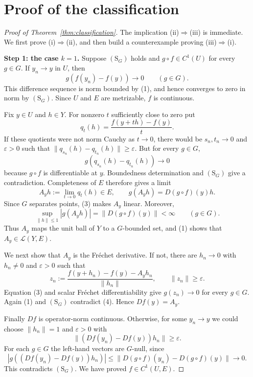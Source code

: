 \documentclass[11pt]{article}
\newcommand{\Lop}{\mathcal L}
\newcommand{\SG}{(\mathrm{S}_G)}
\begin{document}
\section{Proof of the classification}

\begin{proof}[Proof of Theorem~\ref{thm:classification}]
The implication (ii)$\Rightarrow$(iii) is immediate.  We first prove
(i)$\Rightarrow$(ii), and then build a counterexample proving
(iii)$\Rightarrow$(i).

\medskip
\noindent\textbf{Step 1: the case $k=1$.}
Suppose $\SG$ holds and $g\circ f\in C^1(U)$ for every $g\in G$.  If
$y_n\to y$ in $U$, then
\[
  g(f(y_n)-f(y))\longrightarrow0\qquad(g\in G).
\]
This difference sequence is norm bounded by (1), and hence converges to zero
in norm by $\SG$.  Since $U$ and $E$ are metrizable, $f$ is continuous.

Fix $y\in U$ and $h\in Y$.  For nonzero $t$ sufficiently close to zero put
\[
  q_t(h)=\frac{f(y+th)-f(y)}{t}.
\]
If these quotients were not norm Cauchy as $t\to0$, there would be
$s_n,t_n\to0$ and $\varepsilon>0$ such that
$\|q_{s_n}(h)-q_{t_n}(h)\|\geq\varepsilon$.  But for every $g\in G$,
\[
  g(q_{s_n}(h)-q_{t_n}(h))\longrightarrow0
\]
because $g\circ f$ is differentiable at $y$.  Boundedness determination and
$\SG$ give a contradiction.  Completeness of $E$ therefore gives a limit
\[
  A_yh:=\lim_{t\to0}q_t(h)\in E,
  \qquad
  g(A_yh)=D(g\circ f)(y)h.
  \tag{3}
\]
Since $G$ separates points, (3) makes $A_y$ linear.  Moreover,
\[
 \sup_{\|h\|\leq1}|g(A_yh)|=\|D(g\circ f)(y)\|<\infty
 \qquad(g\in G).
\]
Thus $A_y$ maps the unit ball of $Y$ to a $G$-bounded set, and (1) shows that
$A_y\in\Lop(Y,E)$.

We next show that $A_y$ is the Fr\'echet derivative.  If not, there are
$h_n\to0$ with $h_n\ne0$ and $\varepsilon>0$ such that
\[
 z_n:=\frac{f(y+h_n)-f(y)-A_yh_n}{\|h_n\|},
 \qquad \|z_n\|\geq\varepsilon.
 \tag{4}
\]
Equation (3) and scalar Fr\'echet differentiability give
$g(z_n)\to0$ for every $g\in G$.  Again (1) and $\SG$ contradict (4).  Hence
$Df(y)=A_y$.

Finally $Df$ is operator-norm continuous.  Otherwise, for some $y_n\to y$ we
could choose $\|h_n\|=1$ and $\varepsilon>0$ with
\[
 \|(Df(y_n)-Df(y))h_n\|\geq\varepsilon.
\]
For each $g\in G$ the left-hand vectors are $G$-null, since
\[
 |g((Df(y_n)-Df(y))h_n)|
 \leq\|D(g\circ f)(y_n)-D(g\circ f)(y)\|\longrightarrow0.
\]
This contradicts $\SG$.  We have proved $f\in C^1(U,E)$.


\end{proof}
\end{document}
